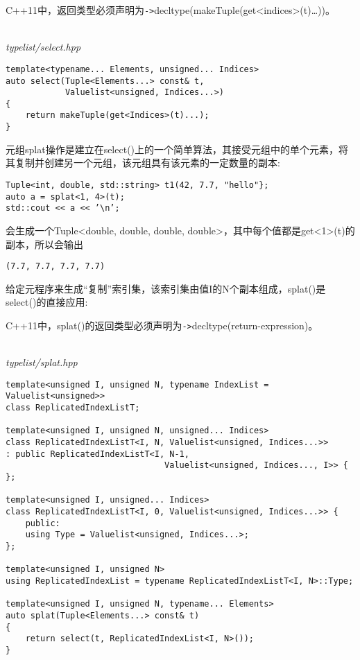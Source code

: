 \begin{tcolorbox}[colback=webgreen!5!white,colframe=webgreen!75!black]
\hspace*{0.75cm}C++11中，返回类型必须声明为\texttt{->}decltype(makeTuple(get<indices>(t)…))。
\end{tcolorbox}

\hspace*{\fill} \\ %
\noindent
\textit{typelist/select.hpp}
\begin{lstlisting}[style=styleCXX]
template<typename... Elements, unsigned... Indices>
auto select(Tuple<Elements...> const& t,
			Valuelist<unsigned, Indices...>)
{
	return makeTuple(get<Indices>(t)...);
}
\end{lstlisting}

元组splat操作是建立在select()上的一个简单算法，其接受元组中的单个元素，将其复制并创建另一个元组，该元组具有该元素的一定数量的副本:

\begin{lstlisting}[style=styleCXX]
Tuple<int, double, std::string> t1(42, 7.7, "hello"};
auto a = splat<1, 4>(t);
std::cout << a << ’\n’;
\end{lstlisting}

会生成一个Tuple<double, double, double, double>，其中每个值都是get<1>(t)的副本，所以会输出

\begin{lstlisting}[style=styleCXX]
(7.7, 7.7, 7.7, 7.7)
\end{lstlisting}

给定元程序来生成“复制”索引集，该索引集由值I的N个副本组成，splat()是select()的直接应用:

\begin{tcolorbox}[colback=webgreen!5!white,colframe=webgreen!75!black]
\hspace*{0.75cm}C++11中，splat()的返回类型必须声明为\texttt{->}decltype(return-expression)。
\end{tcolorbox}

\hspace*{\fill} \\ %
\noindent
\textit{typelist/splat.hpp}
\begin{lstlisting}[style=styleCXX]
template<unsigned I, unsigned N, typename IndexList = Valuelist<unsigned>>
class ReplicatedIndexListT;

template<unsigned I, unsigned N, unsigned... Indices>
class ReplicatedIndexListT<I, N, Valuelist<unsigned, Indices...>>
: public ReplicatedIndexListT<I, N-1,
								Valuelist<unsigned, Indices..., I>> {
};

template<unsigned I, unsigned... Indices>
class ReplicatedIndexListT<I, 0, Valuelist<unsigned, Indices...>> {
	public:
	using Type = Valuelist<unsigned, Indices...>;
};

template<unsigned I, unsigned N>
using ReplicatedIndexList = typename ReplicatedIndexListT<I, N>::Type;

template<unsigned I, unsigned N, typename... Elements>
auto splat(Tuple<Elements...> const& t)
{
	return select(t, ReplicatedIndexList<I, N>());
}
\end{lstlisting}

